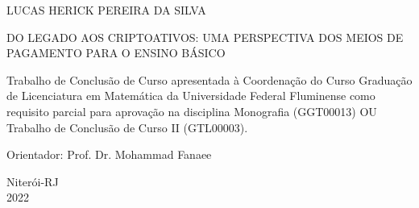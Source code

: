 
\setcounter{page}{1}

\begin{center}
	
	LUCAS HERICK PEREIRA DA SILVA	
	
	\vfill
	
\uppercase{Do legado aos criptoativos: uma perspectiva dos meios de pagamento para o ensino b\'asico} 
	\vspace{3.0cm}
	
	\begin{flushright}
		\begin{minipage}{7.75 cm} %
			\nohyphens{
			Trabalho de Conclusão de Curso apresentada à Coordenação do Curso Graduação de Licenciatura em Matemática da Universidade Federal Fluminense como requisito parcial para aprovação na disciplina Monografia (GGT00013) OU Trabalho de Conclusão de Curso II (GTL00003).
		}
			
			
		\end{minipage}
	\end{flushright}
	
	\vspace{3.0cm}
	
	Orientador: Prof. Dr. Mohammad Fanaee
	
	\vfill
	
	Niterói-RJ\\2022
	
\end{center}
